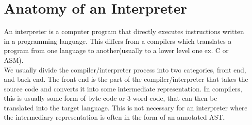 \chapter{Anatomy of an Interpreter}
\label{sec:anatomy}
        
An \gls{interpreter} is a computer program that directly executes instructions written in a programming language.
This differs from a \glspl{compiler} which translates a program from one language to another(usually to a lower level one ex. C or ASM).\\
We usually divide the compiler/interpreter process into two categories, front end, and back end.
The front end is the part of the compiler/interpreter that takes the source code and converts it into some intermediate representation.
In compilers, this is usually some form of byte code or 3-word code, that can then be translated into the target language. 
This is not necessary for an interpreter where the intermediary representation is often in the form of an annotated AST.


